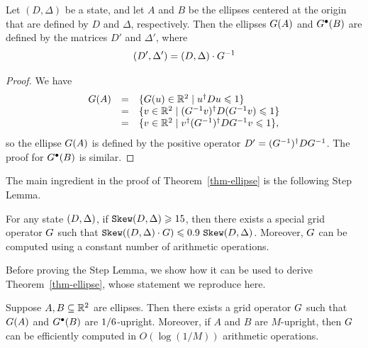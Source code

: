 \begin{lemma}\label{lem-ellipse-action}
  Let $(D,\Delta)$ be a state, and let $A$ and $B$ be the ellipses
  centered at the origin that are defined by $D$ and $\Delta$,
  respectively.  Then the ellipses $G(A)$ and $G^{\bullet}(B)$ are defined
  by the matrices $D'$ and $\Delta'$, where
  \[ (D',\Delta') = (D,\Delta) \cdot G^{-1}
  \]
\end{lemma}

\begin{proof}
  We have 
  \[ \begin{array}{rcl}
    G(A) &=& \{G(u)\in{\mathbb{R}}^2 \mid u^{\dagger} D u \leqslant 1\} \\
    &=& \{v\in{\mathbb{R}}^2 \mid (G^{-1} v)^{\dagger} D(G^{-1} v) \leqslant 1\} \\
    &=& \{v\in{\mathbb{R}}^2 \mid v^{\dagger} (G^{-1})^{\dagger} D G^{-1} v \leqslant 1\},
  \end{array}
  \] 
  so the ellipse $G(A)$ is defined by the positive operator
  $D'=(G^{-1})^{\dagger} D G^{-1}$. The proof for $G^{\bullet}(B)$ is similar.
\end{proof}

The main ingredient in the proof of 
Theorem~\ref{thm-ellipse} is the following Step Lemma.

\begin{lemma}
\label{Step}
For any state $(D,\Delta)$, if $\sk\state \geq \formula{\P}$, 
then there exists a special grid operator $G$ such that 
$\sk (\state \cdot \G)\leq \formula{\Qstep} ~\sk\state$. 
Moreover, $G$ can be computed using a constant number of arithmetic
operations.
\end{lemma}

Before proving the Step Lemma, we show how it can be 
used to derive Theorem~\ref{thm-ellipse}, whose 
statement we reproduce here. 

\begin{un-theorem}
  Suppose $A,B\subseteq {\mathbb{R}}^2$ are ellipses. Then there exists a grid
  operator $G$ such that $G(A)$ and $G^\bullet (B)$ are
  $1/\formula{\oneoverM}$-upright. Moreover, if $A$ and $B$ are
  $M$-upright, then $G$ can be efficiently computed in $O(\log(1/M))$
  arithmetic operations.
\end{un-theorem}

